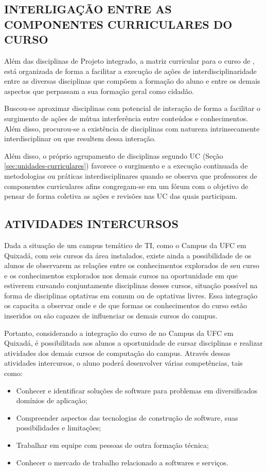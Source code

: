 \subsection{INTERLIGAÇÃO ENTRE AS COMPONENTES CURRICULARES DO CURSO}

Além das disciplinas de Projeto integrado, a matriz curricular para o curso de \nomedocurso, está organizada de forma a facilitar a execução de ações de interdisciplinaridade entre as diversas disciplinas que compõem a formação do aluno e entre os demais aspectos que perpassam a sua formação geral como cidadão.

Buscou-se aproximar disciplinas com potencial de interação de forma a facilitar o surgimento de ações de mútua interferência entre conteúdos e conhecimentos. Além disso, procurou-se a existência de disciplinas com natureza intrinsecamente interdisciplinar ou que resultem dessa interação.

Além disso, o próprio agrupamento de disciplinas segundo UC (Seção \ref{sec:unidades-curriculares}) favorece o surgimento e a execução continuada de metodologias ou práticas interdisciplinares quando se observa que professores de componentes curriculares afins congregam-se em um fórum com o objetivo de pensar de forma coletiva as ações e revisões nas UC das quais participam.

\subsection{ATIVIDADES INTERCURSOS}

Dada a situação de um campus temático de TI, como o Campus da UFC em Quixadá, com seis cursos da área instalados, existe ainda a possibilidade de os alunos de \nomedocurso observarem as relações entre os conhecimentos explorados de seu curso e os conhecimentos explorados nos demais cursos na oportunidade em que estiverem cursando conjuntamente disciplinas desses cursos, situação possível na forma de disciplinas optativas em comum ou de optativas livres. Essa integração os capacita a observar onde e de que formas os conhecimentos do curso estão inseridos ou são capazes de influenciar os demais cursos do campus.

Portanto, considerando a integração do curso de \nomedocurso no Campus da UFC em Quixadá, é possibilitada aos alunos a oportunidade de cursar disciplinas e realizar atividades dos demais cursos de computação do campus. Através dessas atividades intercursos, o aluno poderá desenvolver várias competências, tais como:
\begin{itemize}
    \item Conhecer e identificar soluções de software para problemas em diversificados domínios de aplicação;
    \item Compreender aspectos das tecnologias de construção de software, suas possibilidades e limitações;
    \item Trabalhar em equipe com pessoas de outra formação técnica;
    \item Conhecer o mercado de trabalho relacionado a softwares e serviços.
\end{itemize}

